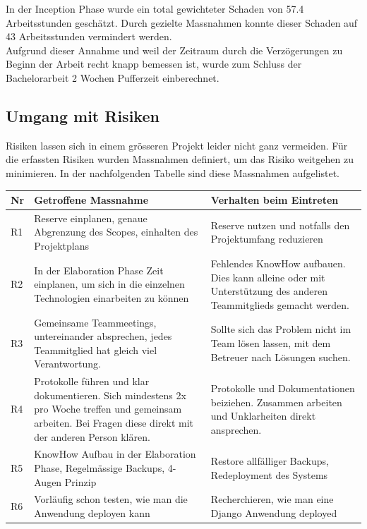 \noindent In der Inception Phase wurde ein total gewichteter Schaden von 57.4 Arbeitsstunden geschätzt. Durch gezielte Massnahmen konnte dieser Schaden auf 43 Arbeitsstunden vermindert werden. \\
Aufgrund dieser Annahme und weil der Zeitraum durch die Verzögerungen zu Beginn der Arbeit recht knapp bemessen ist, wurde zum Schluss der Bachelorarbeit 2 Wochen Pufferzeit einberechnet. 

\subsection{Umgang mit Risiken}
Risiken lassen sich in einem grösseren Projekt leider nicht ganz vermeiden. Für die erfassten Risiken wurden Massnahmen definiert, um das Risiko weitgehen zu minimieren. In der nachfolgenden Tabelle sind diese Massnahmen aufgelistet.

\begin{center}
	\begin{tabularx}{\textwidth}{p{} p{} p{} }
	\toprule
	Nr & Getroffene Massnahme & Verhalten beim Eintreten \\	\midrule
	R1 & Reserve einplanen, genaue Abgrenzung des Scopes, einhalten des Projektplans & Reserve nutzen und notfalls den Projektumfang reduzieren \\
	R2 & In der Elaboration Phase Zeit einplanen, um sich in die einzelnen Technologien einarbeiten zu können & Fehlendes KnowHow aufbauen. Dies kann alleine oder mit Unterstützung des anderen Teammitglieds gemacht werden. \\
	R3 & Gemeinsame Teammeetings, untereinander absprechen, jedes Teammitglied hat gleich viel Verantwortung. & Sollte sich das Problem nicht im Team lösen lassen, mit dem Betreuer nach Lösungen suchen. \\
	R4 & Protokolle führen und klar dokumentieren. Sich mindestens 2x pro Woche treffen und gemeinsam arbeiten. Bei Fragen diese direkt mit der anderen Person klären. & Protokolle und Dokumentationen beiziehen. Zusammen arbeiten und Unklarheiten direkt ansprechen. \\
	R5 & KnowHow Aufbau in der Elaboration Phase, Regelmässige Backups, 4-Augen Prinzip & Restore allfälliger Backups, Redeployment des Systems \\
	R6 & Vorläufig schon testen, wie man die Anwendung deployen kann & Recherchieren, wie man eine Django Anwendung deployed \\ \bottomrule
	\end{tabularx}
\end{center}

\newpage